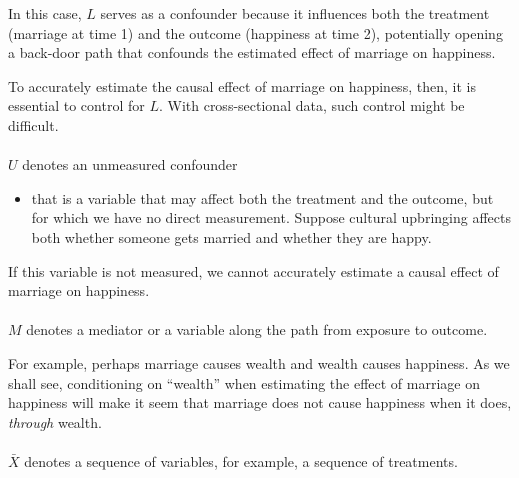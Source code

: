 \documentclass[
  single column]{article}
\makeatletter
\let\oldparagraph\paragraph
\renewcommand{\paragraph}{
    \@ifstar
      \xxxParagraphStar
      \xxxParagraphNoStar
  }
\newcommand{\xxxParagraphStar}[1]{\oldparagraph*{#1}\mbox{}}
\newcommand{\xxxParagraphNoStar}[1]{\oldparagraph{#1}\mbox{}}
\providecommand{\tightlist}{%
  \setlength{\itemsep}{0pt}\setlength{\parskip}{0pt}}\usepackage{longtable,booktabs,array}
\makeatother
\begin{document}
In this case, \(L\) serves as a confounder because it influences both
the treatment (marriage at time 1) and the outcome (happiness at time
2), potentially opening a back-door path that confounds the estimated
effect of marriage on happiness.

To accurately estimate the causal effect of marriage on happiness, then,
it is essential to control for \(L\). With cross-sectional data, such
control might be difficult.

\paragraph{\texorpdfstring{\(U\) denotes an unmeasured
confounder}{U denotes an unmeasured confounder}}\label{u-denotes-an-unmeasured-confounder}

\begin{itemize}
\tightlist
\item
  that is a variable that may affect both the treatment and the outcome,
  but for which we have no direct measurement. Suppose cultural
  upbringing affects both whether someone gets married and whether they
  are happy.
\end{itemize}

If this variable is not measured, we cannot accurately estimate a causal
effect of marriage on happiness.

\paragraph{\texorpdfstring{\(M\) denotes a mediator or a variable along
the path from exposure to
outcome.}{M denotes a mediator or a variable along the path from exposure to outcome.}}\label{m-denotes-a-mediator-or-a-variable-along-the-path-from-exposure-to-outcome.}

For example, perhaps marriage causes wealth and wealth causes happiness.
As we shall see, conditioning on ``wealth'' when estimating the effect
of marriage on happiness will make it seem that marriage does not cause
happiness when it does, \emph{through} wealth.

\paragraph{\texorpdfstring{\(\bar{X}\) denotes a sequence of variables,
for example, a sequence of
treatments.}{\textbackslash bar\{X\} denotes a sequence of variables, for example, a sequence of treatments.}}\label{barx-denotes-a-sequence-of-variables-for-example-a-sequence-of-treatments.}
\end{document}

